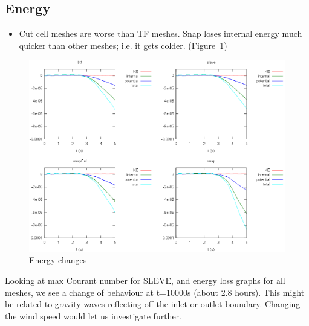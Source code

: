 \subsection{Energy}
\begin{itemize}
	\item Cut cell meshes are worse than TF meshes.  Snap loses internal energy much quicker than other meshes; i.e. it gets colder. (Figure~\ref{fig:gw:energy})
\end{itemize}

\begin{figure}
	\includegraphics[width=\textwidth]{interim-results/gravityWavesEnergy.png}
	\caption{Energy changes}
	\label{fig:gw:energy}
\end{figure}

Looking at max Courant number for SLEVE, and energy loss graphs for all meshes, we see a change of behaviour at t=10000s (about 2.8 hours).  This might be related to gravity waves reflecting off the inlet or outlet boundary.  Changing the wind speed would let us investigate further.
